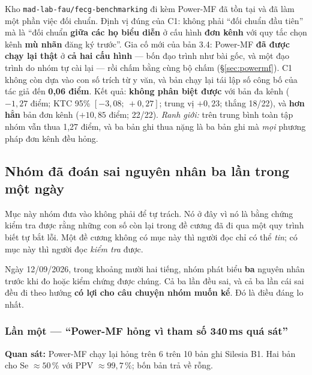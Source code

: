 \begin{description}[leftmargin=2.4em,style=nextline,itemsep=6pt]
\item[C1 --- yếu hơn nhóm tưởng, nhưng bản 3.3 đã gia cố một phần.]
Kho \texttt{mad-lab-fau/fecg-benchmarking} đi kèm Power-MF đã tồn tại và đã làm một phần việc đối chuẩn.
Định vị đúng của C1: không phải ``đối chuẩn đầu tiên'' mà là ``đối chuẩn \textbf{giữa các họ biểu diễn}
ở cấu hình \textbf{đơn kênh} với quy tắc chọn kênh \textbf{mù nhãn} đăng ký trước''.
Gia cố mới của bản 3.4: Power-MF \textbf{đã được chạy lại thật} ở \textbf{cả hai cấu hình} --- bốn đạo
trình như bài gốc, và một đạo trình do nhóm tự cài lại --- rồi chấm bằng cùng bộ chấm
(\S\ref{sec:powermf}). C1 không còn dựa vào con số trích từ y văn, và bản chạy lại tái lập số công bố
của tác giả đến \textbf{0,06 điểm}. Kết quả: \textbf{không phân biệt được} với bản đa kênh ($-1{,}27$
điểm; KTC 95\% $[-3{,}08;\ +0{,}27]$; trung vị $+0{,}23$; thắng 18/22), và \textbf{hơn hẳn} bản đơn kênh
($+10{,}85$ điểm; 22/22). \textit{Ranh giới:} trên trung bình toàn tập nhóm vẫn thua 1,27 điểm, và ba
bản ghi thua nặng là ba bản ghi mà \textit{mọi} phương pháp đơn kênh đều hỏng.

\end{description}

\subsection{Nhóm đã đoán sai nguyên nhân ba lần trong một ngày}
\label{sec:doansai}

Mục này nhóm đưa vào không phải để tự trách. Nó ở đây vì nó là bằng chứng kiểm tra được rằng những con
số còn lại trong đề cương đã đi qua một quy trình biết tự bắt lỗi. Một đề cương không có mục này thì
người đọc chỉ có thể \textit{tin}; có mục này thì người đọc \textit{kiểm tra} được.

Ngày 12/09/2026, trong khoảng mười hai tiếng, nhóm phát biểu \textbf{ba} nguyên nhân trước khi đo hoặc
kiểm chứng được chúng. Cả ba lần đều sai, và cả ba lần cái sai đều đi theo hướng \textbf{có lợi cho câu
chuyện nhóm muốn kể}. Đó là điều đáng lo nhất.

\subsubsection{Lần một --- ``Power-MF hỏng vì tham số 340\,ms quá sát''}

\textbf{Quan sát:} Power-MF chạy lại hỏng trên 6 trên 10 bản ghi Silesia B1. Hai bản cho
Se $\approx 50$\,\% với PPV $\approx 99{,}7$\,\%; bốn bản trả về rỗng.


